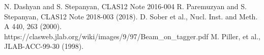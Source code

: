 \documentclass[12pt]{article}
\begin{document}
\begin{thebibliography}{00}
 N. Dashyan and S. Stepanyan, CLAS12 Note 2016-004
 R. Paremuzyan and S. Stepanyan, CLAS12 Note 2018-003 (2018).
 D. Sober et al., Nucl. Inst. and Meth. A 440, 263 (2000).
 https://clasweb.jlab.org/wiki/images/9/97/Beam\_on\_tagger.pdf
 M. Piller, et al., JLAB-ACC-99-30 (1998).
\end{thebibliography}


%
\end{document}
